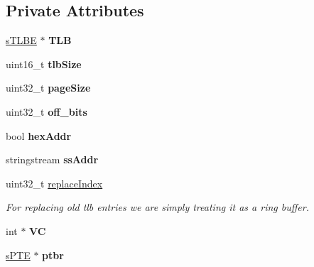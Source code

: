 \subsection*{\-Private \-Attributes}
\begin{DoxyCompactItemize}
\item 
\hypertarget{classcMMU_a0d648c0b2700336ccd048d338e3c0f40}{\hyperlink{structsTLBE}{s\-T\-L\-B\-E} $\ast$ {\bfseries \-T\-L\-B}}\label{df/deb/classcMMU_a0d648c0b2700336ccd048d338e3c0f40}

\item 
\hypertarget{classcMMU_a33bae6bddbaa164c3c8bec3369dac99e}{uint16\-\_\-t {\bfseries tlb\-Size}}\label{df/deb/classcMMU_a33bae6bddbaa164c3c8bec3369dac99e}

\item 
\hypertarget{classcMMU_a518605a6810c2db0e4c3c6118d68eecd}{uint32\-\_\-t {\bfseries page\-Size}}\label{df/deb/classcMMU_a518605a6810c2db0e4c3c6118d68eecd}

\item 
\hypertarget{classcMMU_a00cef287ae02c5007a3462d833b2aaaa}{uint32\-\_\-t {\bfseries off\-\_\-bits}}\label{df/deb/classcMMU_a00cef287ae02c5007a3462d833b2aaaa}

\item 
\hypertarget{classcMMU_ac747da0e08fa4988c1f1d6c0b89ec304}{bool {\bfseries hex\-Addr}}\label{df/deb/classcMMU_ac747da0e08fa4988c1f1d6c0b89ec304}

\item 
\hypertarget{classcMMU_a3a3f41d64f9d10bcd75d04553c7d2fbb}{stringstream {\bfseries ss\-Addr}}\label{df/deb/classcMMU_a3a3f41d64f9d10bcd75d04553c7d2fbb}

\item 
uint32\-\_\-t \hyperlink{classcMMU_a90cbcd50347e8b9030f66bce2fc52e2a}{replace\-Index}
\begin{DoxyCompactList}\small\item\em \-For replacing old tlb entries we are simply treating it as a ring buffer. \end{DoxyCompactList}\item 
\hypertarget{classcMMU_a32b0fcd59b1afd0a73170cc6f10b4e8e}{int $\ast$ {\bfseries \-V\-C}}\label{df/deb/classcMMU_a32b0fcd59b1afd0a73170cc6f10b4e8e}

\item 
\hypertarget{classcMMU_ac2cb598634fc88375313eac3d9ec9348}{\hyperlink{structsPTE}{s\-P\-T\-E} $\ast$ {\bfseries ptbr}}\label{df/deb/classcMMU_ac2cb598634fc88375313eac3d9ec9348}


\end{DoxyCompactItemize}
